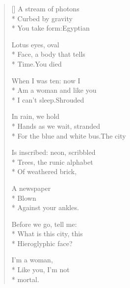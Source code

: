\begingroup
{}
\label{ch:marilyn_poems}
\renewcommand{\poemtoc}{subsection}
\label{ch:hourglass}
\settowidth{\versewidth}{For the blue and white bus.\quad The city}
\begin{verse}[\versewidth]
A stream of photons\\*
Curbed by gravity\\*
You take form:\qquad Egyptian

Lotus eyes, oval\\*
Face, a body that tells\\*
Time.\qquad You died

When I was ten:  now I\\*
Am a woman and like you\\*
I can't sleep.\quad Shrouded

In rain, we hold\\*
Hands as we wait, stranded\\*
For the blue and white bus.\quad The city

Is inscribed: neon, scribbled\\*
Trees, the runic alphabet\\*
Of weathered brick,

A newspaper\\*
Blown\\*
Against your ankles.

Before we go, tell me:\\*
What is this city, this\\*
Hieroglyphic face?  

I'm a woman,\\*
Like you, I'm not\\*
mortal.
\end{verse}

\clearpage

